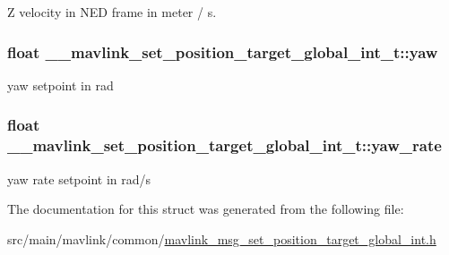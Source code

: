 Z velocity in N\+E\+D frame in meter / s. 

\hypertarget{struct____mavlink__set__position__target__global__int__t_a90f00b091abf9c2c2c72df71d156468e}{
\subsubsection[{yaw}]{\setlength{\rightskip}{0pt plus 5cm}float \+\_\+\+\_\+mavlink\+\_\+set\+\_\+position\+\_\+target\+\_\+global\+\_\+int\+\_\+t\+::yaw}}\label{struct____mavlink__set__position__target__global__int__t_a90f00b091abf9c2c2c72df71d156468e}


yaw setpoint in rad 

\hypertarget{struct____mavlink__set__position__target__global__int__t_a672c17866b8d76e8710ca86551117a00}{
\subsubsection[{yaw\+\_\+rate}]{\setlength{\rightskip}{0pt plus 5cm}float \+\_\+\+\_\+mavlink\+\_\+set\+\_\+position\+\_\+target\+\_\+global\+\_\+int\+\_\+t\+::yaw\+\_\+rate}}\label{struct____mavlink__set__position__target__global__int__t_a672c17866b8d76e8710ca86551117a00}


yaw rate setpoint in rad/s 



The documentation for this struct was generated from the following file\+:\begin{DoxyCompactItemize}
\item 
src/main/mavlink/common/\hyperlink{mavlink__msg__set__position__target__global__int_8h}{mavlink\+\_\+msg\+\_\+set\+\_\+position\+\_\+target\+\_\+global\+\_\+int.\+h}\end{DoxyCompactItemize}
